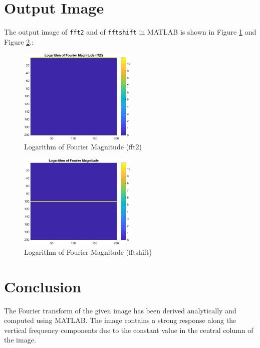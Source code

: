 \documentclass{article}
\begin{document}
\section*{Output Image}

The output image of \texttt{fft2} and of \texttt{fftshift} in MATLAB is shown in Figure \ref{fig:q4_1} and Figure \ref{fig:q4}.:

\begin{figure}[H]
    \centering
    \includegraphics[width=0.5\textwidth]{fft2_output.png}
    \caption{Logarithm of Fourier Magnitude (fft2)}
    \label{fig:q4_1}
\end{figure}

\begin{figure}[H]
    \centering
    \includegraphics[width=0.5\textwidth]{fourier_output.png}
    \caption{Logarithm of Fourier Magnitude (fftshift)}
    \label{fig:q4}
\end{figure}

\section*{Conclusion}

The Fourier transform of the given image has been derived analytically and computed using MATLAB. The image contains a strong response along the vertical frequency components due to the constant value in the central column of the image.
\end{document}
